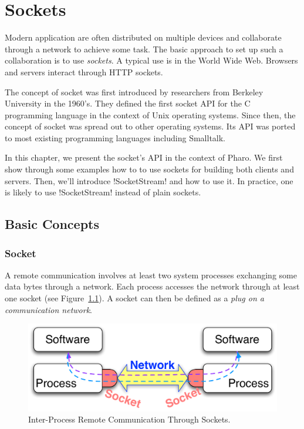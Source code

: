 \documentclass[a4paper,10pt,twoside]{book}
\begin{document}
	\sloppy
\fi
\newcommand{\nouryComment}[1]{}


\chapter{Sockets}\label{cha:sockets}
\chapterauthor{\authornoury{}}

Modern application are often distributed on multiple devices and collaborate through a network to achieve some task.
The basic approach to set up such a collaboration is to use \textit{sockets}.
A typical use is in the World Wide Web. Browsers and servers interact through HTTP sockets.

The concept of socket was first introduced by researchers from Berkeley University in the 1960's. They defined the first socket API for the C programming language in the context of Unix operating systems. Since then, the concept of socket was spread out to other operating systems. 
Its API was ported to most existing programming languages including Smalltalk.

In this chapter, we present the socket's API in the context of Pharo.
We first show through some examples how to to use sockets for building both clients and servers.
Then, we'll introduce \ct!SocketStream! and how to use it.
In practice, one is likely to use \ct!SocketStream! instead of plain sockets.

\section{Basic Concepts}
\subsection{Socket}
A remote communication involves at least two system processes exchanging some data bytes through a network. Each process accesses the network through at least one socket (see Figure~\ref{fig:socketConcept}).
A socket can then be defined as a \textit{plug on a communication network}.

\begin{figure}[ht]\centering
	\includegraphics[width=.75\linewidth]{socketConcept}
	\caption{Inter-Process Remote Communication Through Sockets.}
	\label{fig:socketConcept}
\end{figure}
\end{document}
